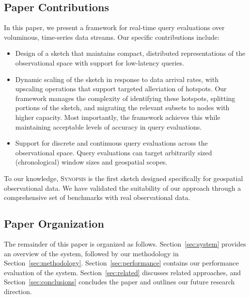 \subsection{Paper Contributions}
In this paper, we present a framework for real-time query evaluations over voluminous, time-series data streams. Our specific contributions include:
\begin{itemize}
\item   Design of a sketch that maintains compact, distributed representations of the observational space with support for low-latency queries.

\item   Dynamic scaling of the sketch in response to data arrival rates, with upscaling operations that support targeted alleviation of hotspots. Our framework manages the complexity of identifying these hotspots, splitting portions of the sketch, and migrating the relevant subsets to nodes with higher capacity. Most importantly, the framework achieves this while maintaining acceptable levels of accuracy in query evaluations.

\item   Support for discrete and continuous query evaluations across the observational space. Query evaluations can target arbitrarily sized (chronological) window sizes and geospatial scopes.
\end{itemize}
To our knowledge, \textsc{Synopsis} is the first sketch designed specifically for geospatial observational data. We have validated the suitability of our approach through a comprehensive set of benchmarks with real observational data. 

\subsection{Paper Organization}
The remainder of this paper is organized as follows. Section~\ref{sec:system} provides an overview of the system, followed by our methodology in Section~\ref{sec:methodology}. Section~\ref{sec:performance} contains our performance evaluation of the system. Section~\ref{sec:related} discusses related approaches, and Section~\ref{sec:conclusions} concludes the paper and outlines our future research direction.

